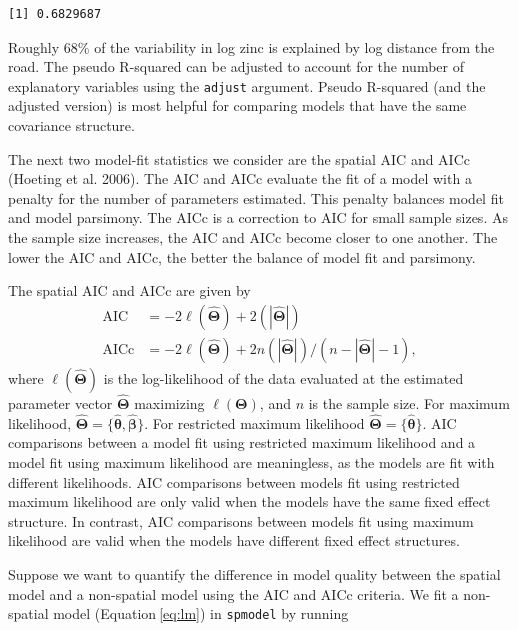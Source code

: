 \documentclass{article}
\begin{document}
\begin{verbatim}
[1] 0.6829687
\end{verbatim}

Roughly 68\% of the variability in log zinc is explained by log distance
from the road. The pseudo R-squared can be adjusted to account for the
number of explanatory variables using the \texttt{adjust} argument.
Pseudo R-squared (and the adjusted version) is most helpful for
comparing models that have the same covariance structure.

The next two model-fit statistics we consider are the spatial AIC and
AICc (Hoeting et al. 2006). The AIC and AICc evaluate the fit of a model
with a penalty for the number of parameters estimated. This penalty
balances model fit and model parsimony. The AICc is a correction to AIC
for small sample sizes. As the sample size increases, the AIC and AICc
become closer to one another. The lower the AIC and AICc, the better the
balance of model fit and parsimony.

The spatial AIC and AICc are given by \begin{equation*}\label{eq:sp_aic}
  \begin{split}
    \text{AIC} & = -2\ell(\hat{\boldsymbol{\Theta}}) + 2(|\hat{\boldsymbol{\Theta}}|) \\
    \text{AICc} & = -2\ell(\hat{\boldsymbol{\Theta}}) + 2n(|\hat{\boldsymbol{\Theta}}|) / (n - |\hat{\boldsymbol{\Theta}}| - 1),
  \end{split}
\end{equation*} where \(\ell(\hat{\boldsymbol{\Theta}})\) is the
log-likelihood of the data evaluated at the estimated parameter vector
\(\hat{\boldsymbol{\Theta}}\) maximizing \(\ell(\boldsymbol{\Theta})\),
and \(n\) is the sample size. For maximum likelihood,
\(\hat{\boldsymbol{\Theta}} = \{\hat{\boldsymbol{\theta}}, \hat{\boldsymbol{\beta}}\}\).
For restricted maximum likelihood
\(\hat{\boldsymbol{\Theta}} = \{\hat{\boldsymbol{\theta}}\}\). AIC
comparisons between a model fit using restricted maximum likelihood and
a model fit using maximum likelihood are meaningless, as the models are
fit with different likelihoods. AIC comparisons between models fit using
restricted maximum likelihood are only valid when the models have the
same fixed effect structure. In contrast, AIC comparisons between models
fit using maximum likelihood are valid when the models have different
fixed effect structures.

Suppose we want to quantify the difference in model quality between the
spatial model and a non-spatial model using the AIC and AICc criteria.
We fit a non-spatial model (Equation\(~\)\ref{eq:lm}) in
\texttt{spmodel} by running
\end{document}
